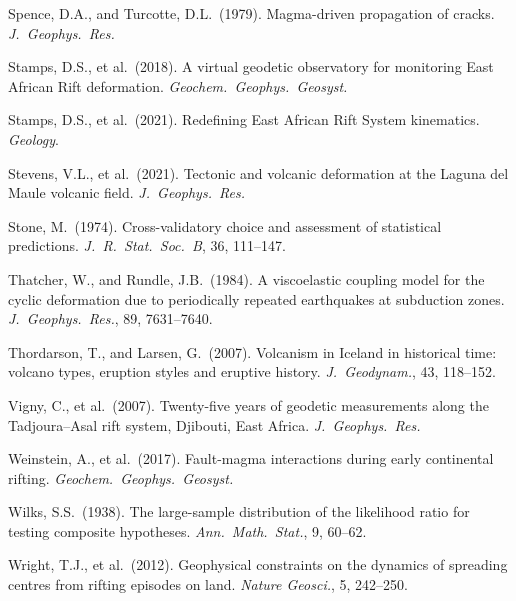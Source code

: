 \documentclass[12pt]{article}
\begin{document}
\begin{description}
  \item Spence, D.A., and Turcotte, D.L.\ (1979). Magma-driven propagation of
    cracks. \textit{J.\ Geophys.\ Res.}
  \item Stamps, D.S., et al.\ (2018). A virtual geodetic observatory for
    monitoring East African Rift deformation.
    \textit{Geochem.\ Geophys.\ Geosyst.}
  \item Stamps, D.S., et al.\ (2021). Redefining East African Rift System
    kinematics. \textit{Geology}.
  \item Stevens, V.L., et al.\ (2021). Tectonic and volcanic deformation at
    the Laguna del Maule volcanic field. \textit{J.\ Geophys.\ Res.}
  \item Stone, M.\ (1974). Cross-validatory choice and assessment of
    statistical predictions. \textit{J.\ R.\ Stat.\ Soc.\ B}, 36, 111--147.
  \item Thatcher, W., and Rundle, J.B.\ (1984). A viscoelastic coupling model
    for the cyclic deformation due to periodically repeated earthquakes at
    subduction zones. \textit{J.\ Geophys.\ Res.}, 89, 7631--7640.
  \item Thordarson, T., and Larsen, G.\ (2007). Volcanism in Iceland in
    historical time: volcano types, eruption styles and eruptive history.
    \textit{J.\ Geodynam.}, 43, 118--152.
  \item Vigny, C., et al.\ (2007). Twenty-five years of geodetic measurements
    along the Tadjoura--Asal rift system, Djibouti, East Africa.
    \textit{J.\ Geophys.\ Res.}
  \item Weinstein, A., et al.\ (2017). Fault-magma interactions during early
    continental rifting. \textit{Geochem.\ Geophys.\ Geosyst.}
  \item Wilks, S.S.\ (1938). The large-sample distribution of the likelihood
    ratio for testing composite hypotheses. \textit{Ann.\ Math.\ Stat.},
    9, 60--62.
  \item Wright, T.J., et al.\ (2012). Geophysical constraints on the dynamics
    of spreading centres from rifting episodes on land.
    \textit{Nature Geosci.}, 5, 242--250.
\end{description}
\end{document}

